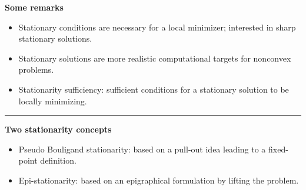 \documentclass[aspectratio=169,xcolor=dvipsnames]{beamer}
\begin{document}
\begin{frame}
  \small
  \textbf{Some remarks}
  \begin{itemize}
    \setlength{\itemsep}{0.10cm}
    \item Stationary conditions are necessary for a local minimizer;
      interested in {\color{MediumBlue}sharp} stationary solutions.
    \item Stationary solutions are more realistic computational targets for
      nonconvex problems.
    \item \textcolor{MediumRed}{Stationarity sufficiency:} sufficient
      conditions for a stationary solution to be locally minimizing.
  \end{itemize}

  \vspace{0.12cm}
  {\color{MediumBlack}\rule{\linewidth}{0.4pt}}
  \vspace{0.10cm}

  \textbf{Two stationarity concepts}
  \begin{itemize}
    \setlength{\itemsep}{0.10cm}
    \item {\color{MediumBlue}Pseudo Bouligand stationarity:} based on a
      \textcolor{MediumRed}{pull-out} idea leading to a
      \textcolor{MediumRed}{fixed-point definition}.
    \item {\color{MediumBlue}Epi-stationarity:} based on an epigraphical
      formulation by lifting the problem.
  \end{itemize}
\end{frame}
\end{document}

